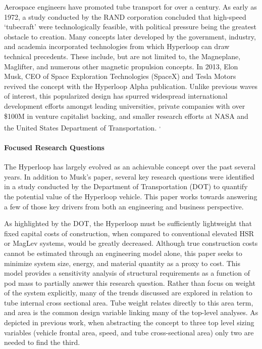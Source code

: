     Aerospace engineers have promoted tube transport for over a century.
    As early as 1972, a study conducted by the RAND corporation concluded that
    high-speed `tubecraft' were technologically feasible, with political pressure being the greatest
    obstacle to creation.\cite{RAND} Many concepts later developed by
    the government, industry, and academia incorporated technologies from which
    Hyperloop can draw technical precedents.
    These include, but are not limited to, the Magneplane, Maglifter, and numerous
    other magnetic propulsion concepts. In 2013, Elon Musk, CEO of Space Exploration
    Technologies (SpaceX) and Tesla Motors revived the concept with the
    Hyperloop Alpha publication.\cite{Musk}
    Unlike previous waves of interest, this popularized design has spurred widespread international
    development efforts amongst leading universities, private companies with over
    \$100M in venture capitalist backing, and smaller research efforts at NASA and the
    United States Department of Transportation. \cite{Chin}\textsuperscript{,} \cite{Volpe}

\paragraph{Focused Research Questions}

    The Hyperloop has largely evolved as an achievable concept over the past several years.
    In addition to Musk's paper, several key research questions were identified in a study conducted
    by the Department of Transportation (DOT) to quantify the potential value of the
    Hyperloop vehicle. \cite{Volpe} This paper works towards answering a few of
    those key drivers from both an engineering and business perspective.

    As highlighted by the DOT, the Hyperloop must be sufficiently lightweight
    that fixed capital costs of construction, when compared to conventional
    elevated HSR or MagLev systems, would be greatly decreased.
    Although true construction costs cannot be estimated through an engineering
    model alone, this paper seeks to minimize system size, energy, and material
    quantity as a proxy to cost. This model provides a sensitivity
    analysis of structural requirements as a function of pod mass to partially
    answer this research question. Rather than focus on weight of the system explicitly,
    many of the trends discussed are explored in relation to tube internal
    cross sectional area. Tube weight relates directly to this area term, and
    area is the common design variable linking many of the top-level
    analyses. As depicted in previous work,
    \cite{Chin} when abstracting the concept to three top level
    sizing variables (vehicle frontal area, speed, and tube cross-sectional area)
    only two are needed to find the third.

